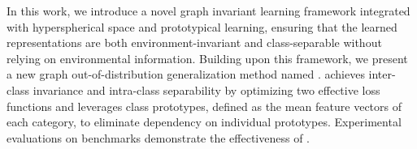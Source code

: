 In this work, we introduce a novel graph invariant learning framework integrated with hyperspherical space and prototypical learning, ensuring that the learned representations are both environment-invariant and class-separable without relying on environmental information. Building upon this framework, we present a new graph out-of-distribution generalization method named \ourmethod. \ourmethod achieves inter-class invariance and intra-class separability by optimizing two effective loss functions and leverages class prototypes, defined as the mean feature vectors of each category, to eliminate dependency on individual prototypes. Experimental evaluations on benchmarks demonstrate the effectiveness of \ourmethod.
